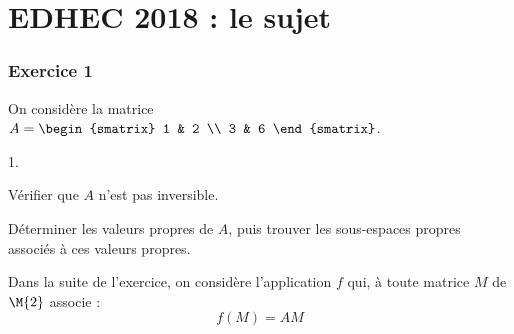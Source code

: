 \chapter*{EDHEC 2018 : le sujet}
  
%


\subsection*{Exercice 1}

\noindent
On considère la matrice $A =
\begin{smatrix}
  1 & 2 \\
  3 & 6
\end{smatrix}
$.
\begin{noliste}{1.}
  \setlength{\itemsep}{4mm}
\item Vérifier que $A$ n'est pas inversible.

  

\item Déterminer les valeurs propres de $A$, puis trouver les
  sous-espaces propres associés à ces valeurs propres.

  
\end{noliste}
Dans la suite de l'exercice, on considère l'application $f$ qui, à
toute matrice $M$ de $\M{2}$ associe :
\[
f(M) = AM
\]
